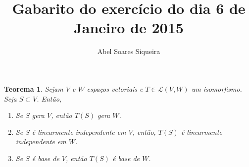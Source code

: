 \documentclass{article}
\title{Gabarito do exercício do dia 6 de Janeiro de 2015}
\author{Abel Soares Siqueira}
\date{}
\newtheorem{teorema}{Teorema}
\begin{document}
\maketitle

\begin{teorema}
  Sejam $V$ e $W$ espaços vetoriais e $T \in
  \mathcal{L}(V,W)$ um isomorfismo. Seja $S\subset V$.
  Então,
  \begin{enumerate}
    \item Se $S$ gera $V$, então $T(S)$ gera $W$.
    \item Se $S$ é linearmente independente em $V$,
      então, $T(S)$ é linearmente independente em $W$.
    \item Se $S$ é base de $V$, então $T(S)$ é base de
      $W$.
  \end{enumerate}
\end{teorema}
\end{document}
